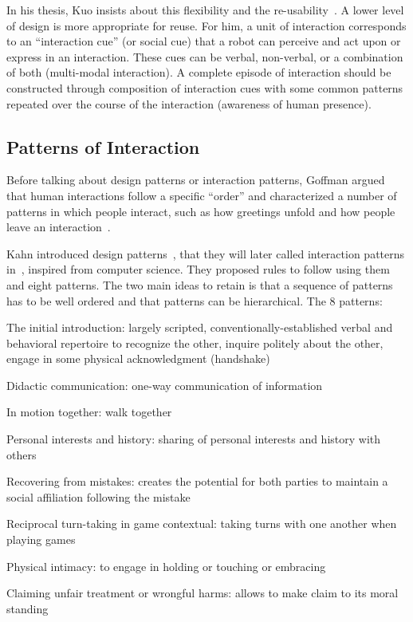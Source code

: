 \documentclass[a4paper,11pt,twoside]{StyleThese}
\begin{document}
In his thesis, Kuo insists about this flexibility and the re-usability~\cite{kuo_2012_designing}. A lower level of design is more appropriate for reuse. For him, a unit of interaction corresponds to an ``interaction cue'' (or social cue) that a robot can perceive and act upon or express in an interaction. These cues can be verbal, non-verbal, or a combination of both (multi-modal interaction). A complete episode of interaction should be constructed through composition of interaction cues with some common patterns repeated over the course of the interaction (\eg awareness of human presence).

\subsection{Patterns of Interaction}\label{chap1:subsec:inter_patt}
Before talking about design patterns or interaction patterns, Goffman argued that human interactions follow a specific ``order'' and characterized a number of patterns in which people interact, such as how greetings unfold and how people leave an interaction~\cite{goffman_1983_interaction}.

Kahn \etal{} introduced design patterns~\cite{kahn_2008_design}, that they will later called interaction patterns in~\cite{kahn_2010_validating}, inspired from computer science. They proposed rules to follow using them and eight patterns. The two main ideas to retain is that a sequence of patterns has to be well ordered and that patterns can be hierarchical. 
The 8 patterns: 
\begin{bulletList}
	\item The initial introduction: largely scripted, conventionally-established verbal and behavioral repertoire to recognize the other, inquire politely about the other, engage in some physical acknowledgment (\eg handshake)
	\item Didactic communication: one-way communication of information 
	\item In motion together: walk together
	\item Personal interests and history: sharing of personal interests and history with others
	\item Recovering from mistakes: creates the potential for both parties to maintain a social affiliation following the mistake
	\item Reciprocal turn-taking in game contextual: taking turns with one another when playing games
	\item Physical intimacy: to engage in holding or touching or embracing
	\item Claiming unfair treatment or wrongful harms: allows to make claim to its moral standing
\end{bulletList}
\end{document}
